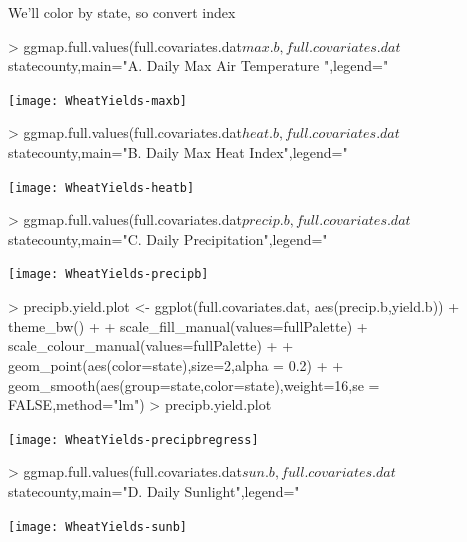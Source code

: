 \documentclass{report}
\begin{document}
We'll color by state, so convert index



\begin{Schunk}
\begin{Sinput}
> ggmap.full.values(full.covariates.dat$max.b,full.covariates.dat$statecounty,main="A. Daily Max Air Temperature ",legend="%
\end{Sinput}
\end{Schunk}
\texttt{[image: WheatYields-maxb]}

\begin{Schunk}
\begin{Sinput}
> ggmap.full.values(full.covariates.dat$heat.b,full.covariates.dat$statecounty,main="B. Daily Max Heat Index",legend="%
\end{Sinput}
\end{Schunk}
\texttt{[image: WheatYields-heatb]}

\begin{Schunk}
\begin{Sinput}
> ggmap.full.values(full.covariates.dat$precip.b,full.covariates.dat$statecounty,main="C. Daily Precipitation",legend="%
\end{Sinput}
\end{Schunk}
\texttt{[image: WheatYields-precipb]}

\begin{Schunk}
\begin{Sinput}
> precipb.yield.plot <- ggplot(full.covariates.dat, aes(precip.b,yield.b)) + theme_bw() + 
+                       scale_fill_manual(values=fullPalette) + scale_colour_manual(values=fullPalette) + 
+                       geom_point(aes(color=state),size=2,alpha = 0.2) + 
+                       geom_smooth(aes(group=state,color=state),weight=16,se = FALSE,method="lm")
> precipb.yield.plot
\end{Sinput}
\end{Schunk}
\texttt{[image: WheatYields-precipbregress]}

\begin{Schunk}
\begin{Sinput}
> ggmap.full.values(full.covariates.dat$sun.b,full.covariates.dat$statecounty,main="D. Daily Sunlight",legend="%
\end{Sinput}
\end{Schunk}
\texttt{[image: WheatYields-sunb]}
\end{document}
